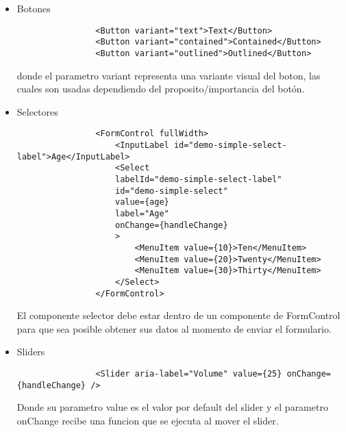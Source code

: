         \begin{itemize}
            \item Botones\\
            
            \begin{lstlisting}
                <Button variant="text">Text</Button>
                <Button variant="contained">Contained</Button>
                <Button variant="outlined">Outlined</Button>
            \end{lstlisting}

            donde el parametro variant representa una variante visual del boton, las cuales son usadas dependiendo del proposito/importancia del botón.

            \item Selectores\\

            \begin{lstlisting}
                <FormControl fullWidth>
                    <InputLabel id="demo-simple-select-label">Age</InputLabel>
                    <Select
                    labelId="demo-simple-select-label"
                    id="demo-simple-select"
                    value={age}
                    label="Age"
                    onChange={handleChange}
                    >
                        <MenuItem value={10}>Ten</MenuItem>
                        <MenuItem value={20}>Twenty</MenuItem>
                        <MenuItem value={30}>Thirty</MenuItem>
                    </Select>
                </FormControl>
            \end{lstlisting}

            El componente selector debe estar dentro de un componente de FormControl para que sea posible obtener sus datos al momento de enviar el formulario.
            
            \item Sliders\\
            
            \begin{lstlisting}
                <Slider aria-label="Volume" value={25} onChange={handleChange} />
            \end{lstlisting}

            Donde su parametro value es el valor por default del slider y el parametro onChange recibe una funcion que se ejecuta al mover el slider.

        \end{itemize}

